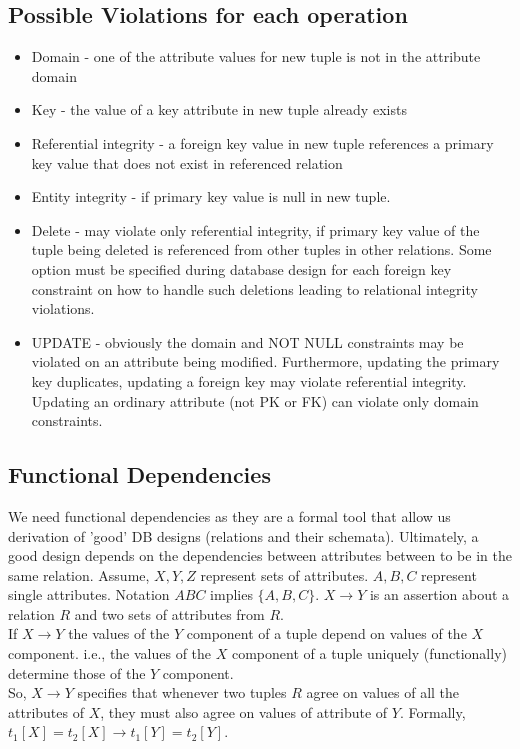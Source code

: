 \documentclass[a4paper]{article}
\theoremstyle{plain}
\theoremstyle{definition}
\theoremstyle{remark}
\begin{document}
	\subsection{Possible Violations for each operation}
	\begin{itemize}
		\item Domain - one of the attribute values for new tuple is not in the attribute domain
		\item Key - the value of a key attribute in new tuple already exists
		\item Referential integrity - a foreign key value in new tuple references a primary key value that does not exist in referenced relation
		\item Entity integrity - if primary key value is null in new tuple.
		\item Delete - may violate only referential integrity, if primary key value of the tuple being deleted is referenced from other tuples in other relations. Some option must be specified during database design for each foreign key constraint on how to handle such deletions leading to relational integrity violations.
		\item UPDATE - obviously the domain and NOT NULL constraints may be violated on an attribute being modified. Furthermore, updating the primary key duplicates, updating a foreign key may violate referential integrity. Updating an ordinary attribute (not PK or FK) can violate only domain constraints.
	\end{itemize}
	\subsection{Functional Dependencies}
	We need functional dependencies as they are a formal tool that allow us derivation of 'good' DB designs (relations and their schemata). Ultimately, a good design depends on the dependencies between attributes between to be in the same relation. Assume, $X,Y,Z$ represent sets of attributes. $A,B,C$ represent single attributes. Notation $ABC$ implies $\{A,B,C\}$. $X\to Y$ is an assertion about a relation $R$ and two sets of attributes from $R$. \\
	If $X\to Y$ the values of the $Y$ component of a tuple depend on values of the $X$ component. i.e., the values of the $X$ component of a tuple uniquely (functionally) determine those of the $Y$ component.  \\
	So, $X \to Y$ specifies that whenever two tuples $R$ agree on values of all the attributes of $X$, they must also agree on values of attribute of $Y$. Formally, $t_1[X] = t_2[X] \to t_1[Y] = t_2[Y]$. 
\end{document}
